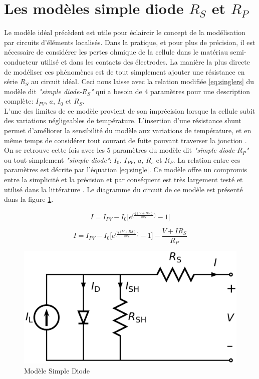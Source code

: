 \section{Les modèles simple diode $R_S$ et $R_P$}
Le modèle idéal précèdent est utile pour éclaircir le concept de la modélisation par circuits d'éléments localisés. Dans la pratique, et pour plus de précision, il est nécessaire de considérer les pertes ohmique de la cellule dans le matériau semi-conducteur utilisé et dans les contacts des électrodes. La manière la plus directe de modéliser ces phénomènes est de tout simplement ajouter une résistance en série $R_S$ au circuit idéal. Ceci nous laisse avec la relation modifiée \ref{eq:singlers} du modèle dit \textit{"simple diode-$R_S$"} qui a besoin de 4 paramètres pour une description complète: $I_{PV}$, $a$, $I_0$ et $R_S$.\\
L'une des limites de ce modèle provient de son imprécision lorsque la cellule subit des variations négligeables de température. L'insertion d'une résistance shunt permet d'améliorer la sensibilité du modèle aux variations de température, et en même temps de considérer tout courant de fuite pouvant traverser la jonction \cite{Chin2015b}. On se retrouve cette fois avec les 5 paramètres du modèle dit \textit{"simple diode-$R_P$"} ou tout simplement \textit{"simple diode"}: $I_0$, $I_{PV}$, $a$, $R_s$ et $R_P$. La relation entre ces paramètres est décrite par l'équation \ref{eq:single}. Ce modèle offre un compromis entre la simplicité et la précision et par conséquent est très largement testé et utilisé dans la littérature \cite{Carrero2007}. Le diagramme du circuit de ce modèle est présenté dans la figure \ref{fig:single}.

\begin{equation}
  \label{eq:singlers}
  I = I_{PV} - I_0 \bigg[e^{\big(\frac{q(V + RS)}{akT}\big)} - 1\bigg]
\end{equation}

\begin{equation}
  \label{eq:single}
  I = I_{PV} - I_0 \bigg[e^{\big(\frac{q(V + RS)}{akT}\big)} - 1\bigg] - \frac{V + I R_S}{R_P}
\end{equation}

\begin{figure}
  \begin{center}
    \includegraphics[width=.5\textwidth]{resources/eqcirc.png}
    \caption{Modèle Simple Diode}
    \label{fig:single}
  \end{center}
\end{figure}

